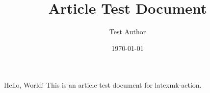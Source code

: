 \documentclass{article}
\title{Article Test Document}
\author{Test Author}
\date{\today}
\begin{document}
\maketitle
Hello, World! This is an article test document for latexmk-action.
\end{document}
